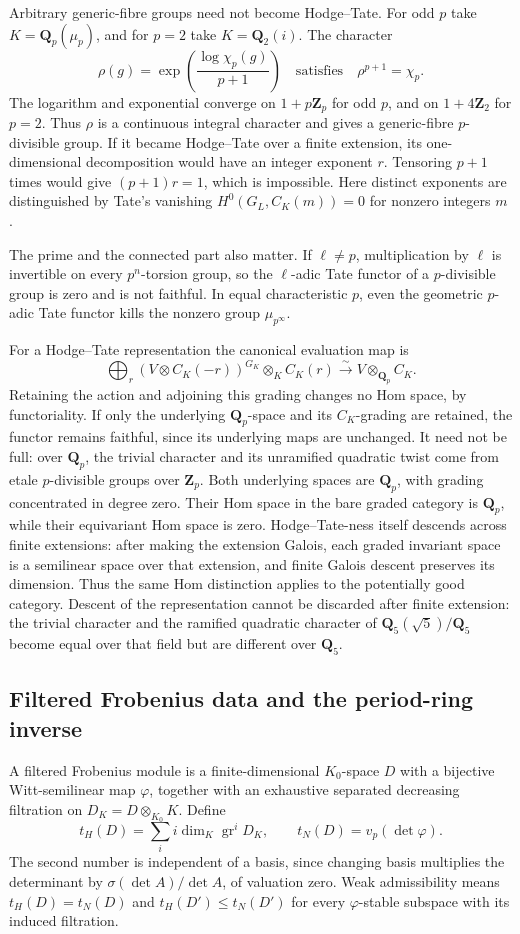 \documentclass[11pt]{article}
\theoremstyle{definition}\newtheorem{definition}[theorem]{Definition}
\theoremstyle{remark}\newtheorem{remark}[theorem]{Remark}
\newcommand{\Q}{\mathbf Q}\newcommand{\Z}{\mathbf Z}
\DeclareMathOperator{\gr}{gr}\DeclareMathOperator{\GL}{GL}
\begin{document}
Arbitrary generic-fibre groups need not become Hodge--Tate. For odd $p$ take $K=\Q_p(\mu_p)$, and for $p=2$ take $K=\Q_2(i)$. The character
\[
 \rho(g)=\exp\left(\frac{\log\chi_p(g)}{p+1}\right)
 \quad\text{satisfies}\quad \rho^{p+1}=\chi_p.
\]
The logarithm and exponential converge on $1+p\Z_p$ for odd $p$, and on $1+4\Z_2$ for $p=2$. Thus $\rho$ is a continuous integral character and gives a generic-fibre $p$-divisible group. If it became Hodge--Tate over a finite extension, its one-dimensional decomposition would have an integer exponent $r$. Tensoring $p+1$ times would give $(p+1)r=1$, which is impossible. Here distinct exponents are distinguished by Tate's vanishing $H^0(G_L,C_K(m))=0$ for nonzero integers $m$ \cite[\S3, Theorem~2, p.~176]{TateLocal}.

The prime and the connected part also matter. If $\ell\ne p$, multiplication by $\ell$ is invertible on every $p^n$-torsion group, so the $\ell$-adic Tate functor of a $p$-divisible group is zero and is not faithful. In equal characteristic $p$, even the geometric $p$-adic Tate functor kills the nonzero group $\mu_{p^\infty}$.

For a Hodge--Tate representation the canonical evaluation map is
\[
 \bigoplus_r (V\otimes C_K(-r))^{G_K}\otimes_K C_K(r)
       \xrightarrow{\sim}V\otimes_{\Q_p}C_K.
\]
Retaining the action and adjoining this grading changes no Hom space, by functoriality. If only the underlying $\Q_p$-space and its $C_K$-grading are retained, the functor remains faithful, since its underlying maps are unchanged. It need not be full: over $\Q_p$, the trivial character and its unramified quadratic twist come from etale $p$-divisible groups over $\Z_p$. Both underlying spaces are $\Q_p$, with grading concentrated in degree zero. Their Hom space in the bare graded category is $\Q_p$, while their equivariant Hom space is zero. Hodge--Tate-ness itself descends across finite extensions: after making the extension Galois, each graded invariant space is a semilinear space over that extension, and finite Galois descent preserves its dimension. Thus the same Hom distinction applies to the potentially good category. Descent of the representation cannot be discarded after finite extension: the trivial character and the ramified quadratic character of $\Q_5(\sqrt5)/\Q_5$ become equal over that field but are different over $\Q_5$.

\subsection{Filtered Frobenius data and the period-ring inverse}
A filtered Frobenius module is a finite-dimensional $K_0$-space $D$ with a bijective Witt-semilinear map $\varphi$, together with an exhaustive separated decreasing filtration on $D_K=D\otimes_{K_0}K$. Define
\[
 t_H(D)=\sum_i i\dim_K\gr^i D_K,\qquad t_N(D)=v_p(\det\varphi).
\]
The second number is independent of a basis, since changing basis multiplies the determinant by $\sigma(\det A)/\det A$, of valuation zero. Weak admissibility means $t_H(D)=t_N(D)$ and $t_H(D')\le t_N(D')$ for every $\varphi$-stable subspace with its induced filtration.
\end{document}
